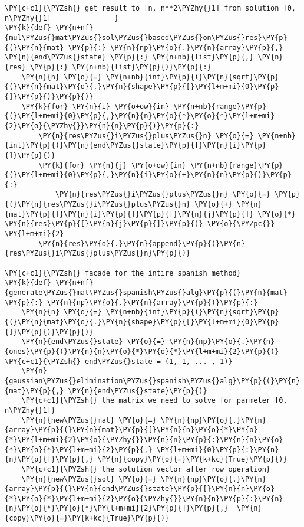 \begin{english}
\begin{tcolorbox}[breakable, size=fbox, boxrule=1pt, pad at break*=1mm,colback=cellbackground, colframe=cellborder]
\begin{Verbatim}[commandchars=\\\{\}]
\PY{c+c1}{\PYZsh{} get result to [n, n**2\PYZhy{}1] from solution [0, n\PYZhy{}1]               }
\PY{k}{def} \PY{n+nf}{mul\PYZus{}mat\PYZus{}sol\PYZus{}based\PYZus{}on\PYZus{}res}\PY{p}{(}\PY{n}{mat} \PY{p}{:} \PY{n}{np}\PY{o}{.}\PY{n}{array}\PY{p}{,} \PY{n}{end\PYZus{}state} \PY{p}{:} \PY{n+nb}{list}\PY{p}{,} \PY{n}{res} \PY{p}{:} \PY{n+nb}{list}\PY{p}{)}\PY{p}{:}
    \PY{n}{n} \PY{o}{=} \PY{n+nb}{int}\PY{p}{(}\PY{n}{sqrt}\PY{p}{(}\PY{n}{mat}\PY{o}{.}\PY{n}{shape}\PY{p}{[}\PY{l+m+mi}{0}\PY{p}{]}\PY{p}{)}\PY{p}{)}
    \PY{k}{for} \PY{n}{i} \PY{o+ow}{in} \PY{n+nb}{range}\PY{p}{(}\PY{l+m+mi}{0}\PY{p}{,}\PY{n}{n}\PY{o}{*}\PY{o}{*}\PY{l+m+mi}{2}\PY{o}{\PYZhy{}}\PY{n}{n}\PY{p}{)}\PY{p}{:}
        \PY{n}{res\PYZus{}i\PYZus{}plus\PYZus{}n} \PY{o}{=} \PY{n+nb}{int}\PY{p}{(}\PY{n}{end\PYZus{}state}\PY{p}{[}\PY{n}{i}\PY{p}{]}\PY{p}{)}
        \PY{k}{for} \PY{n}{j} \PY{o+ow}{in} \PY{n+nb}{range}\PY{p}{(}\PY{l+m+mi}{0}\PY{p}{,}\PY{n}{i}\PY{o}{+}\PY{n}{n}\PY{p}{)}\PY{p}{:}
            \PY{n}{res\PYZus{}i\PYZus{}plus\PYZus{}n} \PY{o}{=} \PY{p}{(}\PY{n}{res\PYZus{}i\PYZus{}plus\PYZus{}n} \PY{o}{+} \PY{n}{mat}\PY{p}{[}\PY{n}{i}\PY{p}{]}\PY{p}{[}\PY{n}{j}\PY{p}{]} \PY{o}{*} \PY{n}{res}\PY{p}{[}\PY{n}{j}\PY{p}{]}\PY{p}{)} \PY{o}{\PYZpc{}} \PY{l+m+mi}{2}
        \PY{n}{res}\PY{o}{.}\PY{n}{append}\PY{p}{(}\PY{n}{res\PYZus{}i\PYZus{}plus\PYZus{}n}\PY{p}{)}

\PY{c+c1}{\PYZsh{} facade for the intire spanish method}
\PY{k}{def} \PY{n+nf}{generate\PYZus{}mat\PYZus{}spanish\PYZus{}alg}\PY{p}{(}\PY{n}{mat} \PY{p}{:} \PY{n}{np}\PY{o}{.}\PY{n}{array}\PY{p}{)}\PY{p}{:}
    \PY{n}{n} \PY{o}{=} \PY{n+nb}{int}\PY{p}{(}\PY{n}{sqrt}\PY{p}{(}\PY{n}{mat}\PY{o}{.}\PY{n}{shape}\PY{p}{[}\PY{l+m+mi}{0}\PY{p}{]}\PY{p}{)}\PY{p}{)}
    \PY{n}{end\PYZus{}state} \PY{o}{=} \PY{n}{np}\PY{o}{.}\PY{n}{ones}\PY{p}{(}\PY{n}{n}\PY{o}{*}\PY{o}{*}\PY{l+m+mi}{2}\PY{p}{)} \PY{c+c1}{\PYZsh{} end\PYZus{}state = (1, 1, ... , 1)}
    \PY{n}{gaussian\PYZus{}elimination\PYZus{}spanish\PYZus{}alg}\PY{p}{(}\PY{n}{mat}\PY{p}{,} \PY{n}{end\PYZus{}state}\PY{p}{)}
    \PY{c+c1}{\PYZsh{} the matrix we need to solve for parmeter [0, n\PYZhy{}1]}
    \PY{n}{new\PYZus{}mat} \PY{o}{=} \PY{n}{np}\PY{o}{.}\PY{n}{array}\PY{p}{(}\PY{n}{mat}\PY{p}{[}\PY{n}{n}\PY{o}{*}\PY{o}{*}\PY{l+m+mi}{2}\PY{o}{\PYZhy{}}\PY{n}{n}\PY{p}{:}\PY{n}{n}\PY{o}{*}\PY{o}{*}\PY{l+m+mi}{2}\PY{p}{,} \PY{l+m+mi}{0}\PY{p}{:}\PY{n}{n}\PY{p}{]}\PY{p}{,} \PY{n}{copy}\PY{o}{=}\PY{k+kc}{True}\PY{p}{)}
    \PY{c+c1}{\PYZsh{} the solution vector after row operation}
    \PY{n}{new\PYZus{}sol} \PY{o}{=} \PY{n}{np}\PY{o}{.}\PY{n}{array}\PY{p}{(}\PY{n}{end\PYZus{}state}\PY{p}{[}\PY{n}{n}\PY{o}{*}\PY{o}{*}\PY{l+m+mi}{2}\PY{o}{\PYZhy{}}\PY{n}{n}\PY{p}{:}\PY{n}{n}\PY{o}{*}\PY{o}{*}\PY{l+m+mi}{2}\PY{p}{]}\PY{p}{,}  \PY{n}{copy}\PY{o}{=}\PY{k+kc}{True}\PY{p}{)}
    

\end{Verbatim}
\end{tcolorbox}
\end{english}
